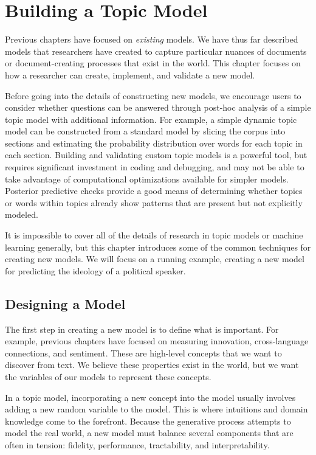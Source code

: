\chapter{Building a Topic Model}
\label{ch:building}

Previous chapters have focused on \emph{existing} models.  
We have thus far described
models that researchers have created to capture particular nuances of documents or
document-creating processes that exist in the world.
This chapter focuses on how a researcher can create, implement, and
validate a new model. 

Before going into the details of constructing new models, we encourage
users to consider whether questions can be answered through post-hoc
analysis of a simple topic model with additional
information.  For example, a simple dynamic topic model can be
constructed from a standard  model by slicing the corpus into
sections and estimating the probability distribution over words for
each topic in each section.  Building and validating custom topic
models is a powerful tool, but requires significant investment in
coding and debugging, and may not be able to take advantage of
computational optimizations available for simpler models.  Posterior
predictive checks \citep{mimno-11Bayesian} provide a good means of
determining whether  topics or words within topics already
show patterns that are present but not explicitly modeled.

It is impossible to cover all of the details of research in topic
models or machine learning generally, but this chapter introduces some
of the common techniques for creating new models.  We will focus on a
running example, creating a new model for predicting the
ideology of a political speaker.

\section{Designing a Model}

The first step in creating a new model is to define what is
important.  For example, previous chapters have focused on measuring
innovation, cross-language connections, and sentiment.  These are
high-level concepts that we want to discover from text.  We believe
these properties exist in the world, but we want the variables of our models to represent
these concepts.

In a topic model, incorporating a new concept into the model usually
involves adding a new random variable to the model.  This is where
intuitions and domain knowledge come to the forefront.  Because the
generative process attempts to model the real world, a new model must
balance several components that are often in tension: fidelity,
performance, tractability, and interpretability.

